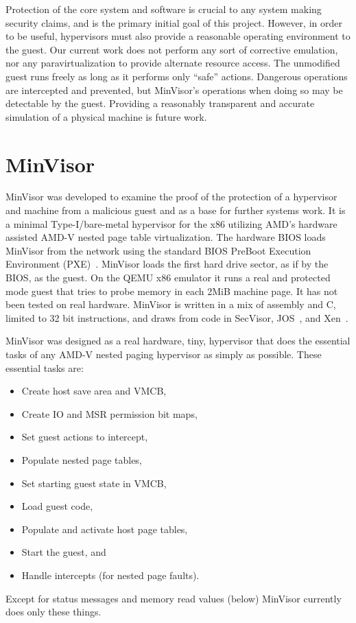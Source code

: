 \documentclass[submission,copyright]{eptcs} \providecommand{\event}{ACL2 2011}
\begin{document}
Protection of the core system and software is crucial to any system
making security claims, and is the primary initial goal of this
project. However, in order to be useful, hypervisors must also provide
a reasonable operating environment to the guest.  Our current work
does not perform any sort of corrective emulation, nor any
paravirtualization to provide alternate resource access.
The unmodified guest runs freely as long as it
performs only ``safe'' actions.  Dangerous operations are intercepted
and prevented, but MinVisor's operations when doing so may be
detectable by the guest.  Providing a reasonably transparent and accurate
simulation of a physical machine is future work.

\section{MinVisor}
\label{MinVisor}


MinVisor was developed to examine the proof of the protection of a
hypervisor and machine from a malicious guest and as a base for
further systems work.  It is a minimal Type-I/bare-metal hypervisor
for the x86 utilizing AMD's hardware assisted AMD-V nested page table
virtualization.  The hardware BIOS loads MinVisor from the network
using the standard BIOS PreBoot Execution Environment
(PXE)~\cite{PXE}.  MinVisor loads the first hard drive sector, as if
by the BIOS, as the guest.  On the QEMU x86 emulator it runs a real
and protected mode guest that tries to probe memory in each 2MiB
machine page.  It has not been tested on real hardware.  MinVisor is
written in a mix of assembly and C, limited to 32 bit instructions,
and draws from code in SecVisor, JOS~\cite{JOS}, and Xen~\cite{XEN}.

MinVisor was designed as a real hardware, tiny, hypervisor
that does the essential tasks of any AMD-V nested paging 
 hypervisor as simply as possible.
These essential tasks are:
\begin{itemize}
\item Create host save area and VMCB,
\item Create IO and MSR permission bit maps,
\item Set guest actions to intercept,
\item Populate nested page tables,
\item Set starting guest state in VMCB, 
\item Load guest code, 
\item Populate and activate host page tables, 
\item Start the guest, and
\item Handle intercepts (for nested page faults).
\end{itemize}
Except for status messages and memory read values (below)
MinVisor currently does only these things.
\end{document}
